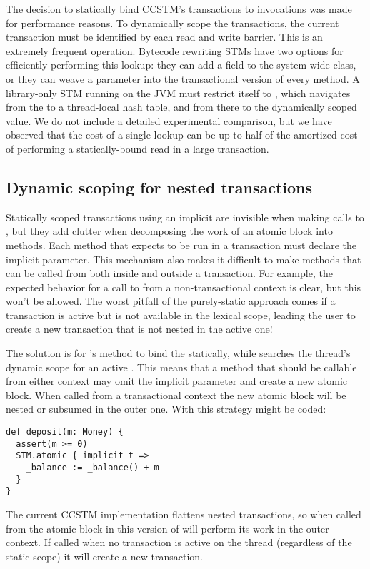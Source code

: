 The decision to statically bind CCSTM's transactions to 
invocations was made for performance reasons.  To dynamically scope
the transactions, the current transaction must be identified by each
read and write barrier.  This is an extremely frequent operation.
Bytecode rewriting STMs have two options for efficiently performing this
lookup: they can add a field to the system-wide  class,
or they can weave a  parameter into the transactional version
of every method.  A library-only STM running on the JVM must restrict
itself to , which navigates from the 
to a thread-local hash table, and from there to the dynamically scoped
value.  We do not include a detailed experimental comparison, but we
have observed that the cost of a single  lookup can
be up to half of the amortized cost of performing a statically-bound
read in a large transaction.

\subsection{Dynamic scoping for nested transactions}
\label{sec:hybrid}

Statically scoped transactions using an implicit  are invisible
when making calls to , but they add clutter when decomposing the
work of an atomic block into methods.  Each method that expects to be run
in a transaction must declare the implicit parameter.  This mechanism also
makes it difficult to make methods that can be called from both inside and
outside a transaction.  For example, the expected behavior for a call to
 from a non-transactional context is clear, but this won't
be allowed.  The worst pitfall of the purely-static approach comes if a
transaction is active but is not available in the lexical scope, leading
the user to create a new transaction that is not nested in the active one!

The solution is for 's method to bind the  statically,
while  searches the thread's dynamic scope for an active
.  This means that a method that should be callable from either
context may omit the implicit  parameter and create a new atomic
block.  When called from a transactional context the new atomic block will
be nested or subsumed in the outer one.  With this strategy 
might be coded:

\lstset{numbers=none}
\lstset{xleftmargin=0.125in}
\begin{lstlisting}
def deposit(m: Money) {
  assert(m >= 0)
  STM.atomic { implicit t =>
    _balance := _balance() + m
  }
}
\end{lstlisting}
\lstset{numbers=left}
\lstset{xleftmargin=0.25in}

The current CCSTM implementation flattens nested transactions, so
when called from the atomic block in  this version of
 will perform its work in the outer context.  If called
when no transaction is active on the thread (regardless of the static
scope) it will create a new transaction.
